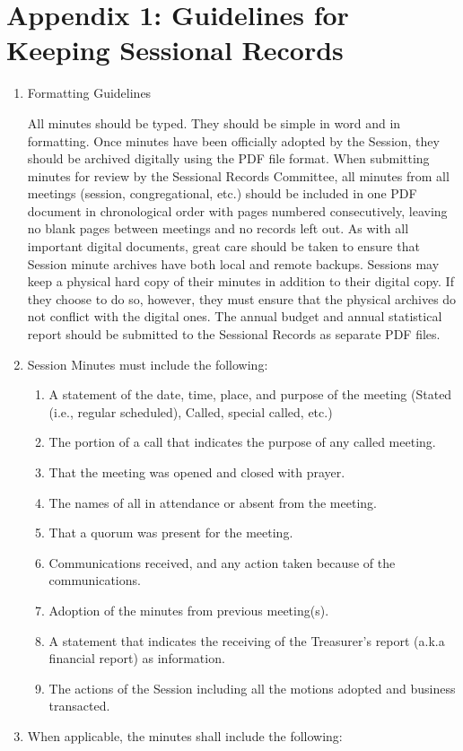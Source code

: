 \documentclass[
]{book}
\providecommand{\tightlist}{%
  \setlength{\itemsep}{0pt}\setlength{\parskip}{0pt}}
\begin{document}
\hypertarget{appendix-1-guidelines-for-keeping-sessional-records}{%
\section*{Appendix 1: Guidelines for Keeping Sessional Records}\label{appendix-1-guidelines-for-keeping-sessional-records}}

\begin{enumerate}
\def\labelenumi{\Alph{enumi}.}
\item
  Formatting Guidelines

  All minutes should be typed. They should be simple in word and in formatting. Once minutes have been officially adopted by the Session, they should be archived digitally using the PDF file format. When submitting minutes for review by the Sessional Records Committee, all minutes from all meetings (session, congregational, etc.) should be included in one PDF document in chronological order with pages numbered consecutively, leaving no blank pages between meetings and no records left out. As with all important digital documents, great care should be taken to ensure that Session minute archives have both local and remote backups. Sessions may keep a physical hard copy of their minutes in addition to their digital copy. If they choose to do so, however, they must ensure that the physical archives do not conflict with the digital ones. The annual budget and annual statistical report should be submitted to the Sessional Records as separate PDF files.
\item
  Session Minutes must include the following:

  \begin{enumerate}
  \def\labelenumii{\arabic{enumii}.}
  \tightlist
  \item
    A statement of the date, time, place, and purpose of the meeting (Stated (i.e., regular scheduled), Called, special called, etc.)
  \item
    The portion of a call that indicates the purpose of any called meeting.
  \item
    That the meeting was opened and closed with prayer.
  \item
    The names of all in attendance or absent from the meeting.
  \item
    That a quorum was present for the meeting.
  \item
    Communications received, and any action taken because of the communications.
  \item
    Adoption of the minutes from previous meeting(s).
  \item
    A statement that indicates the receiving of the Treasurer's report (a.k.a financial report) as information.
  \item
    The actions of the Session including all the motions adopted and business transacted.
  \end{enumerate}
\item
  When applicable, the minutes shall include the following:


\end{enumerate}
\end{document}
